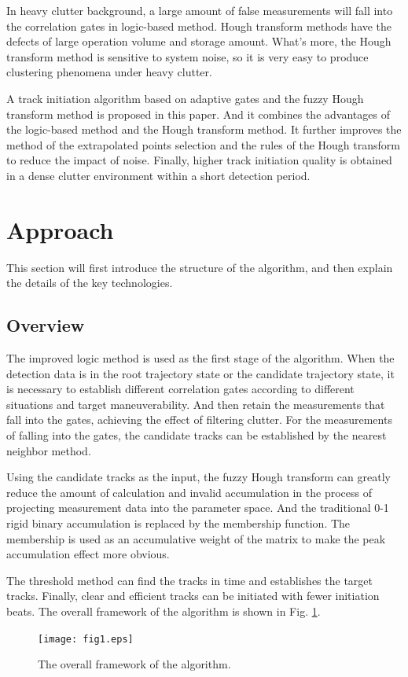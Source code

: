 \documentclass[default,iicol]{sn-jnl}%
\theoremstyle{thmstyleone}%
\theoremstyle{thmstyletwo}%
\theoremstyle{thmstylethree}%
\begin{document}
In heavy clutter background, a large amount of \cite{bib15} false measurements will fall into the correlation gates in logic-based method. Hough transform methods have the defects of large operation volume and storage amount. What's more, the Hough transform method is sensitive to system noise, so it is very easy to produce clustering phenomena under heavy clutter.

A track initiation algorithm based on adaptive gates and the fuzzy Hough transform method is proposed in this paper. And it combines the advantages of the logic-based method and the Hough transform method. It further improves the method of the extrapolated points selection and the rules of the Hough transform to reduce the impact of noise. Finally, higher track initiation quality is obtained in a dense clutter environment within a short detection period.

\section{Approach}\label{sec2}

This section will first introduce the structure of the algorithm, and then explain the details of the key technologies.

\subsection{Overview}\label{subsec1}

The improved logic method is used as the first stage of the algorithm. When the detection data is in the root trajectory state or the candidate trajectory state, it is necessary to establish different correlation gates according to different situations and target maneuverability. And then retain the measurements that fall into the gates, achieving the effect of filtering clutter. For the measurements of falling into the gates, the candidate tracks can be established by the nearest neighbor method.

Using the candidate tracks as the input, the fuzzy Hough transform can greatly reduce the amount of calculation and invalid accumulation in the process of projecting measurement data into the parameter space. And the traditional 0-1 rigid binary accumulation is replaced by the membership function. The membership is used as an accumulative weight of the matrix to make the peak accumulation effect more obvious.

The threshold method can find the tracks in time and establishes the target tracks. Finally, clear and efficient tracks can be initiated with fewer initiation beats. The overall framework of the algorithm is shown in Fig. \ref{fig1}.
\begin{figure}[h]%
    \centering
    \texttt{[image: fig1.eps]}
    \caption{The overall framework of the algorithm.}\label{fig1}
\end{figure}
\end{document}
